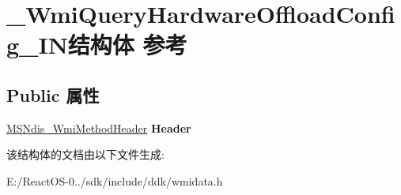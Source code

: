 \hypertarget{struct___wmi_query_hardware_offload_config___i_n}{}\section{\+\_\+\+Wmi\+Query\+Hardware\+Offload\+Config\+\_\+\+I\+N结构体 参考}
\label{struct___wmi_query_hardware_offload_config___i_n}
\subsection*{Public 属性}
\begin{DoxyCompactItemize}
\item 
\mbox{\label{struct___wmi_query_hardware_offload_config___i_n_aac7d82362b95e13d810ce91f466ea7da}} 
\hyperlink{struct___m_s_ndis___wmi_method_header}{M\+S\+Ndis\+\_\+\+Wmi\+Method\+Header} {\bfseries Header}
\end{DoxyCompactItemize}


该结构体的文档由以下文件生成\+:\begin{DoxyCompactItemize}
\item 
E\+:/\+React\+O\+S-\/0../sdk/include/ddk/wmidata.\+h\end{DoxyCompactItemize}
